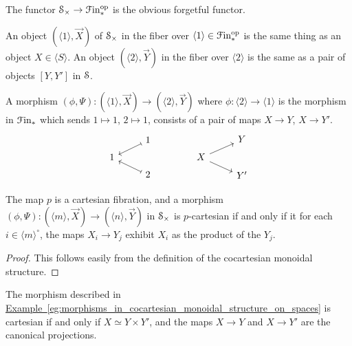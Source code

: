 \documentclass[main.tex]{subfiles}
\begin{document}
The functor $\S_{\times} \to \Finp\op$ is the obvious forgetful functor.

\begin{example}
  \label{eg:morphisms_in_cocartesian_monoidal_structure_on_spaces}
  An object $(\langle 1 \rangle, \vec{X})$ of $\S_{\times}$ in the fiber over $\langle 1 \rangle \in \Finp\op$ is the same thing as an object $X \in \langle S \rangle$. An object $( \langle 2 \rangle, \vec{Y})$ in the fiber over $\langle 2 \rangle$ is the same as a pair of objects $[Y, Y']$ in $\S$.

  A morphism $(\phi, \Psi)\colon (\langle 1 \rangle, \vec{X}) \to (\langle 2 \rangle, \vec{Y})$ where $\phi\colon \langle 2 \rangle \to \langle 1 \rangle$ is the morphism in $\Finp$ which sends $1 \mapsto 1$, $2 \mapsto 1$, consists of a pair of maps $X \to Y$, $X \to Y'$.
  \begin{equation*}
    \begin{tikzcd}[row sep=tiny]
      & 1
      \arrow[dl, mapsto]
      \\
      1
      \\
      & 2
      \arrow[ul, mapsto]
    \end{tikzcd}
    \qquad\qquad
    \begin{tikzcd}[row sep=tiny]
      & Y
      \\
      X
      \arrow[ur]
      \arrow[dr]
      \\
      & Y'
    \end{tikzcd}
  \end{equation*}
\end{example}

\begin{lemma}
  The map $p$ is a cartesian fibration, and a morphism $(\phi, \Psi)\colon (\langle m \rangle, \vec{X}) \to (\langle n \rangle, \vec{Y})$ in $\S_{\times}$ is $p$-cartesian if and only if it for each $i \in \langle m \rangle^{\circ}$, the maps $X_{i} \to Y_{j}$ exhibit $X_{i}$ as the product of the $Y_{j}$.
\end{lemma}
\begin{proof}
  This follows easily from the definition of the cocartesian monoidal structure.
\end{proof}

\begin{example}
  The morphism described in \hyperref[eg:morphisms_in_cocartesian_monoidal_structure_on_spaces]{Example~\ref*{eg:morphisms_in_cocartesian_monoidal_structure_on_spaces}} is cartesian if and only if $X \simeq Y \times Y'$, and the maps $X \to Y$ and $X \to Y'$ are the canonical projections.
\end{example}
\end{document}
